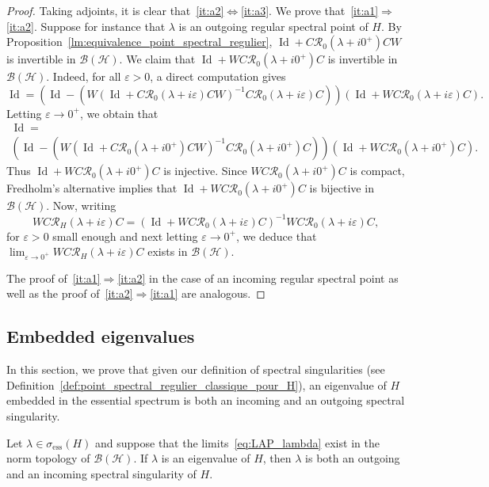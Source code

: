 \documentclass[10pt]{amsart}
\theoremstyle{definition}\newtheorem{defi}[theo]{Definition}\newtheorem{rema}[theo]{Remark}\newtheorem{exam}[theo]{Example}\newtheorem{exem}[theo]{Example}\newtheorem{nota}[theo]{Notation}
\newcommand{\Hi}{\mathcal{H}}
\newcommand{\ess}{\mathrm{ess}}
\newcommand{\Res}{\mathcal{R}}
\newcommand{\clB}{\mathcal{B}}
\DeclareMathOperator{\Id}{Id}
\begin{document}
\begin{proof}
Taking adjoints, it is clear that~\eqref{it:a2}$\Leftrightarrow$\eqref{it:a3}. We prove that~\eqref{it:a1}$\Rightarrow$\eqref{it:a2}. Suppose for instance that $\lambda$ is an outgoing regular spectral point of $H$. By Proposition~\ref{lm:equivalence_point_spectral_regulier}, $\Id+C\Res_0(\lambda+ i0^+)CW$ is invertible in $\clB(\Hi)$. We claim that $\Id+WC\Res_0(\lambda+ i0^+)C$ is invertible in $\clB(\Hi)$. Indeed, for all $\varepsilon>0$, a direct computation gives
\begin{equation*}
\Id=\left(\Id-(W(\Id+C\Res_0(\lambda+ i\varepsilon)CW)^{-1}C\Res_0(\lambda+i\varepsilon)C)\right)\left(\Id+WC\Res_0(\lambda+ i\varepsilon)C\right).
\end{equation*}
Letting $\varepsilon\to0^+$, we obtain that
\begin{multline*}
\Id=\\
\left(\Id-(W(\Id+C\Res_0(\lambda+ i0^+)CW)^{-1}C\Res_0(\lambda+i0^+)C)\right)\left(\Id+WC\Res_0(\lambda+ i0^+)C\right).
\end{multline*}
Thus $\Id+WC\Res_0(\lambda+ i0^+)C$ is injective. Since $WC\Res_0(\lambda+ i0^+)C$ is compact, Fredholm's alternative implies that $\Id+WC\Res_0(\lambda+ i0^+)C$ is bijective in $\clB(\Hi)$. Now, writing
\begin{equation*}
WC\Res_H(\lambda+i\varepsilon)C=(\Id+WC\Res_0
(\lambda+i\varepsilon)C)^{-1}WC\Res_0(\lambda+i\varepsilon)C,
\end{equation*}
for $\varepsilon>0$ small enough and next letting $\varepsilon\to0^+$, we deduce that $\lim_{\varepsilon\rightarrow 0^+} WC\Res_H(\lambda+ i\varepsilon)C$ exists in $\clB(\Hi)$.

The proof of~\eqref{it:a1}$\Rightarrow$\eqref{it:a2} in the case of an incoming regular spectral point as well as the proof of~\eqref{it:a2}$\Rightarrow$\eqref{it:a1} are analogous.
\end{proof}


\subsection{Embedded eigenvalues}\label{sec:embed}

In this section, we prove that given our definition of spectral singularities (see Definition~\ref{def:point_spectral_regulier_classique_pour_H}), an eigenvalue of $H$ embedded in the essential spectrum is both an incoming and an outgoing spectral singularity.

\begin{prop}\label{cor:embed}
Let $\lambda\in \sigma_\ess(H)$ and suppose that the limits~\eqref{eq:LAP_lambda} exist in the norm topology of $\clB(\Hi)$. If $\lambda$ is an eigenvalue of $H$, then $\lambda$ is both an outgoing and an incoming spectral singularity of $H$.
\end{prop}
\end{document}
